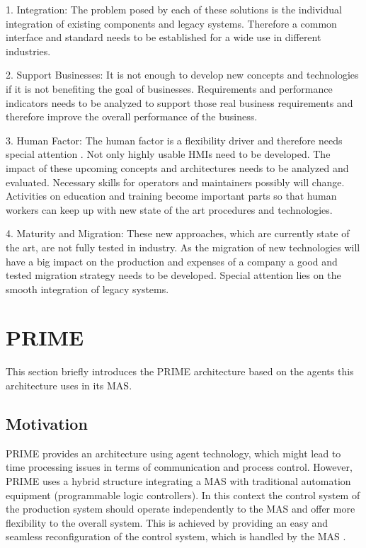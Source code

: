 \documentclass[conference,compsoc,hidelinks]{IEEEtran}
\begin{document}
1. Integration: The problem posed by each of these solutions is the individual integration of existing components and legacy systems. Therefore a common interface and standard needs to be established for a wide use in different industries.

2. Support Businesses: It is not enough to develop new concepts and technologies if it is not benefiting the goal of businesses. Requirements and performance indicators needs to be analyzed to support those real business requirements and therefore improve the overall performance of the business.

3. Human Factor:  The human factor is a flexibility driver and therefore needs special attention \cite{Colombo2009}. Not only highly usable HMIs need to be developed. The impact of these upcoming concepts and architectures needs to be analyzed and evaluated. Necessary skills for operators and maintainers possibly will change. Activities on education and training become important parts so that human workers can keep up with new state of the art procedures and technologies.

4. Maturity and Migration: These new approaches, which are currently state of the art, are not fully tested in industry. As the migration of new technologies will have a big impact on the production and expenses of a company a good and tested migration strategy needs to be developed. Special attention lies on the smooth integration of legacy systems.

\section{PRIME} \label{sec:PRIME}%

This section briefly introduces the PRIME architecture based on the agents this architecture uses in its MAS.
\subsection{Motivation}
PRIME provides an architecture using agent technology, which might lead to time processing issues in terms of communication and process control. However, PRIME uses a hybrid structure integrating a MAS with traditional automation equipment (programmable logic controllers). In this context the control system of the production system should operate independently to the MAS and offer more flexibility to the overall system. This is achieved by providing an easy and seamless reconfiguration of the control system, which is handled by the MAS \cite{Hybrid}.
\end{document}
